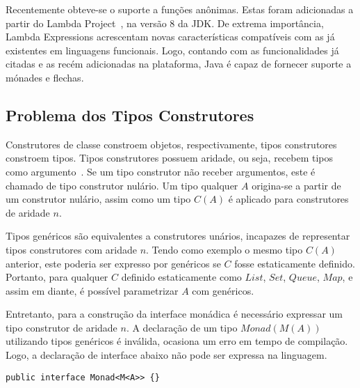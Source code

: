 \documentclass[10pt, conference]{IEEEtran}
\begin{document}
\addtocounter{footnote}{1}

\addtocounter{footnote}{1}

Recentemente obteve-se o suporte a funções anônimas. Estas foram adicionadas a partir do Lambda Project~\cite{jsr335}, na versão 8 da JDK. De extrema importância, Lambda Expressions acrescentam  novas características compatíveis com as já existentes em linguagens funcionais. Logo, contando com as funcionalidades já citadas e as recém adicionadas na plataforma, Java é capaz de fornecer suporte a mónades e flechas.

\subsection{Problema dos Tipos Construtores}

Construtores de classe constroem objetos, respectivamente, tipos construtores constroem tipos. Tipos construtores possuem aridade, ou seja, recebem tipos como argumento~\cite{pierce2002types}. Se um tipo construtor não receber argumentos, este é chamado de tipo construtor nulário. Um tipo qualquer $A$ origina-se a partir de um construtor nulário, assim como um tipo $C(A)$ é aplicado para construtores de aridade $n$.

Tipos genéricos são equivalentes a construtores unários, incapazes de representar tipos construtores com aridade $n$. Tendo como exemplo o mesmo tipo $C(A)$ anterior, este poderia ser expresso por genéricos se $C$ fosse estaticamente definido. Portanto, para qualquer $C$ definido estaticamente como $List$, $Set$, $Queue$, $Map$, e assim em diante, é possível parametrizar $A$ com genéricos.

Entretanto, para a construção da interface monádica é necessário expressar um tipo construtor de aridade $n$. A declaração de um tipo $Monad(M(A))$ utilizando tipos genéricos é inválida, ocasiona um erro em tempo de compilação. Logo, a declaração de interface abaixo não pode ser expressa na linguagem.

\begin{lstlisting}[caption={Interface Monad inválida}, label={lst:invalid-generic-monad}]
public interface Monad<M<A>> {}
\end{lstlisting}
\end{document}
